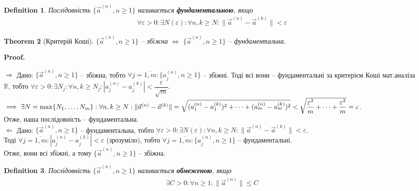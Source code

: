 \documentclass[a4paper, 10pt]{article}
\makeatletter
\def\rightproof{$\boxed{\Rightarrow}$ }
\def\leftproof{$\boxed{\Leftarrow}$ }
\theoremstyle{theoremdd}
\newtheorem{theorem}{Theorem}[subsection]
\theoremstyle{theoremdd}
\theoremstyle{theoremdd}
\newtheorem{definition}[theorem]{Definition}
\theoremstyle{theoremdd}
\theoremstyle{theoremdd}
\theoremstyle{theoremdd}
\theoremstyle{theoremdd}
\theoremstyle{theoremdd}
\theoremstyle{theoremdd}
\renewenvironment{proof}[1][Proof.\\]{\par
\pushQED{\hfill \qed}%
\normalfont \topsep6\p@\@plus6\p@\relax
\trivlist
\item\relax
{\bfseries
#1\@addpunct{.}}\hspace\labelsep\ignorespaces
}{%
\popQED\endtrivlist\@endpefalse
}
\newcommand\Norm[1]{\|#1\|}
\makeatother
\begin{document}
\begin{definition}
Послідовність $\{\vec{a}^{(n)}, n \geq 1 \}$ називається \textbf{фундаментальною}, якщо
\begin{align*}
\forall \varepsilon > 0: \exists N(\varepsilon): \forall n, k \geq N: \Norm{\vec{a}^{(n)} - \vec{a}^{(k)}} < \varepsilon
\end{align*}
\end{definition}

\begin{theorem}[Критерій Коші]
$\{\vec{a}^{(n)}, n \geq 1 \}$ -- збіжна $\iff$ $\{\vec{a}^{(n)}, n \geq 1 \}$ -- фундаментальна.
\end{theorem}

\begin{proof}
\rightproof Дано: $\{\vec{a}^{(n)}, n \geq 1 \}$ -- збіжна, тобто $\forall j = \overline{1,m}: \{a_j^{(n)}, n \geq 1\}$ -- збіжні. Тоді всі вони -- фундаментальні за критерієм Коші мат.аналіза $\mathbb{R}$, тобто $\forall \varepsilon > 0: \exists N_j: \forall n,k \geq N_j: |a_j^{(n)} - a_j^{(k)}| < \dfrac{\varepsilon}{\sqrt{m}}$.\\
$\implies \exists N = \max\{N_1,\dots,N_m\}: \forall n,k \geq N: \\ \Norm{\vec{a}^{(n)} - \vec{a}^{(k)}} = \sqrt{(a_1^{(n)} - a_1^{(k)})^2 + \dots + (a_m^{(n)} - a_m^{(k)})^2} < \sqrt{\dfrac{\varepsilon^2}{m} + \dots + \dfrac{\varepsilon^2}{m}} = \varepsilon$.\\
Отже, наша послідовність -- фундаментальна.
\bigskip \\
\leftproof Дано: $\{\vec{a}^{(n)}, n \geq 1 \}$ -- фундаментальна, тобто $\forall \varepsilon > 0: \exists N(\varepsilon): \forall n, k \geq N: \Norm{\vec{a}^{(n)} - \vec{a}^{(k)}} < \varepsilon$.\\
Тоді $\forall j = \overline{1,m}: |a_j^{(n)} - a_j^{(k)}| < \varepsilon$ (зрозуміло), тобто $\forall j = \overline{1,m}: \{a_j^{(n)}, n \geq 1\}$ -- фундаментальні.\\
Отже, вони всі збіжні, а тому $\{\vec{a}^{(n)}, n \geq 1 \}$ -- збіжна.
\end{proof}

\begin{definition}
Послідовність $\{\vec{a}^{(n)}, n \geq 1 \}$ називається \textbf{обмеженою}, якщо
\begin{align*}
\exists C > 0: \forall n \geq 1: \Norm{\vec{a}^{(n)}} \leq C
\end{align*}
\end{definition}
\end{document}
